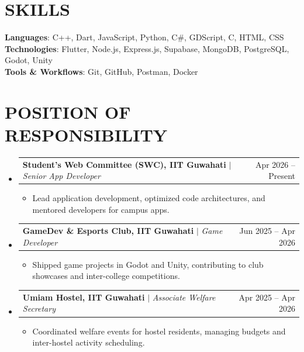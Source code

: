 \documentclass[letterpaper,11pt]{article}
\makeatletter
\newcommand{\resumeItem}[1]{
  \item\small{
    {#1 \vspace{-2pt}}
  }
}
\newcommand{\resumePOR}[3]{
  \vspace{-2pt}\item
    \begin{tabular*}{0.97\textwidth}[t]{l@{\extracolsep{\fill}}r}
      \textbf{#1} $|$ \textit{\small#3} & #2 \\
    \end{tabular*}\vspace{-7pt}
}
\newcommand{\resumeSubHeadingListStart}{\begin{itemize}[leftmargin=0.15in, label={}]}
\newcommand{\resumeSubHeadingListEnd}{\end{itemize}}
\newcommand{\resumeItemListStart}{\begin{itemize}[leftmargin=0.2in]}
\newcommand{\resumeItemListEnd}{\end{itemize}\vspace{-5pt}}
\makeatother
\begin{document}
\section{SKILLS}
 \begin{itemize}[leftmargin=0.15in, label={}]
    \small{\item{
     \textbf{Languages}{: C++, Dart, JavaScript, Python, C\#, GDScript, C, HTML, CSS} \\ \vspace{2pt}
     \textbf{Technologies}{: Flutter, Node.js, Express.js, Supabase, MongoDB, PostgreSQL, Godot, Unity} \\ \vspace{2pt}
     \textbf{Tools \& Workflows}{: Git, GitHub, Postman, Docker}
    }}
 \end{itemize}
 \vspace{-10pt}

\section{POSITION OF RESPONSIBILITY}
  \resumeSubHeadingListStart
    \resumePOR
      {Student's Web Committee (SWC), IIT Guwahati}{Apr 2026 -- Present}
      {Senior App Developer}
      \resumeItemListStart
        \resumeItem{Lead application development, optimized code architectures, and mentored developers for campus apps.}
      \resumeItemListEnd

    \resumePOR
      {GameDev \& Esports Club, IIT Guwahati}{Jun 2025 -- Apr 2026}
      {Game Developer}
      \resumeItemListStart
        \resumeItem{Shipped game projects in Godot and Unity, contributing to club showcases and inter-college competitions.}
      \resumeItemListEnd

    \resumePOR
      {Umiam Hostel, IIT Guwahati}{Apr 2025 -- Apr 2026}
      {Associate Welfare Secretary}
      \resumeItemListStart
        \resumeItem{Coordinated welfare events for hostel residents, managing budgets and inter-hostel activity scheduling.}
      \resumeItemListEnd
  \resumeSubHeadingListEnd

\end{document}
